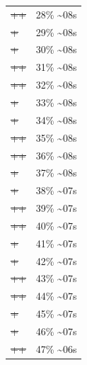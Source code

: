 \documentclass[12pt]{article}
\begin{document}
\begin{center}
\begin{tabular}{ll}
\sout{\sout{\sout{\sout{\sout{\sout{++}}}}}} & 28\% \textasciitilde{}08s\\
\sout{\sout{\sout{\sout{\sout{\sout{\sout{+}}}}}}} & 29\% \textasciitilde{}08s\\
\sout{\sout{\sout{\sout{\sout{\sout{\sout{+}}}}}}} & 30\% \textasciitilde{}08s\\
\sout{\sout{\sout{\sout{\sout{\sout{\sout{++}}}}}}} & 31\% \textasciitilde{}08s\\
\sout{\sout{\sout{\sout{\sout{\sout{\sout{++}}}}}}} & 32\% \textasciitilde{}08s\\
\sout{\sout{\sout{\sout{\sout{\sout{\sout{\sout{+}}}}}}}} & 33\% \textasciitilde{}08s\\
\sout{\sout{\sout{\sout{\sout{\sout{\sout{\sout{+}}}}}}}} & 34\% \textasciitilde{}08s\\
\sout{\sout{\sout{\sout{\sout{\sout{\sout{\sout{++}}}}}}}} & 35\% \textasciitilde{}08s\\
\sout{\sout{\sout{\sout{\sout{\sout{\sout{\sout{++}}}}}}}} & 36\% \textasciitilde{}08s\\
\sout{\sout{\sout{\sout{\sout{\sout{\sout{\sout{\sout{+}}}}}}}}} & 37\% \textasciitilde{}08s\\
\sout{\sout{\sout{\sout{\sout{\sout{\sout{\sout{\sout{+}}}}}}}}} & 38\% \textasciitilde{}07s\\
\sout{\sout{\sout{\sout{\sout{\sout{\sout{\sout{\sout{++}}}}}}}}} & 39\% \textasciitilde{}07s\\
\sout{\sout{\sout{\sout{\sout{\sout{\sout{\sout{\sout{++}}}}}}}}} & 40\% \textasciitilde{}07s\\
\sout{\sout{\sout{\sout{\sout{\sout{\sout{\sout{\sout{\sout{+}}}}}}}}}} & 41\% \textasciitilde{}07s\\
\sout{\sout{\sout{\sout{\sout{\sout{\sout{\sout{\sout{\sout{+}}}}}}}}}} & 42\% \textasciitilde{}07s\\
\sout{\sout{\sout{\sout{\sout{\sout{\sout{\sout{\sout{\sout{++}}}}}}}}}} & 43\% \textasciitilde{}07s\\
\sout{\sout{\sout{\sout{\sout{\sout{\sout{\sout{\sout{\sout{++}}}}}}}}}} & 44\% \textasciitilde{}07s\\
\sout{\sout{\sout{\sout{\sout{\sout{\sout{\sout{\sout{\sout{\sout{+}}}}}}}}}}} & 45\% \textasciitilde{}07s\\
\sout{\sout{\sout{\sout{\sout{\sout{\sout{\sout{\sout{\sout{\sout{+}}}}}}}}}}} & 46\% \textasciitilde{}07s\\
\sout{\sout{\sout{\sout{\sout{\sout{\sout{\sout{\sout{\sout{\sout{++}}}}}}}}}}} & 47\% \textasciitilde{}06s\\

\end{tabular}
\end{center}
\end{document}
